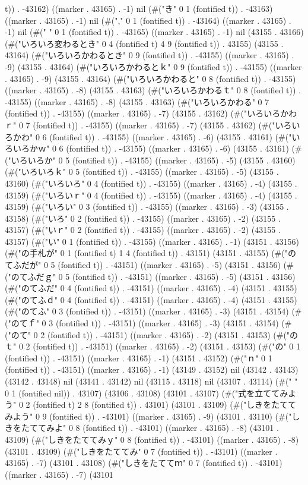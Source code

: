 t)) . -43162) ((marker . 43165) . -1) nil (#("き" 0 1 (fontified t)) . -43163) ((marker . 43165) . -1) nil (#("," 0 1 (fontified t)) . -43164) ((marker . 43165) . -1) nil (#(" " 0 1 (fontified t)) . -43165) ((marker . 43165) . -1) nil (43155 . 43166) (#("いろいろ変わるとき" 0 4 (fontified t) 4 9 (fontified t)) . 43155) (43155 . 43164) (#("いろいろかわるとき" 0 9 (fontified t)) . -43155) ((marker . 43165) . -9) (43155 . 43164) (#("いろいろかわるとｋ" 0 9 (fontified t)) . -43155) ((marker . 43165) . -9) (43155 . 43164) (#("いろいろかわると" 0 8 (fontified t)) . -43155) ((marker . 43165) . -8) (43155 . 43163) (#("いろいろかわるｔ" 0 8 (fontified t)) . -43155) ((marker . 43165) . -8) (43155 . 43163) (#("いろいろかわる" 0 7 (fontified t)) . -43155) ((marker . 43165) . -7) (43155 . 43162) (#("いろいろかわｒ" 0 7 (fontified t)) . -43155) ((marker . 43165) . -7) (43155 . 43162) (#("いろいろかわ" 0 6 (fontified t)) . -43155) ((marker . 43165) . -6) (43155 . 43161) (#("いろいろかｗ" 0 6 (fontified t)) . -43155) ((marker . 43165) . -6) (43155 . 43161) (#("いろいろか" 0 5 (fontified t)) . -43155) ((marker . 43165) . -5) (43155 . 43160) (#("いろいろｋ" 0 5 (fontified t)) . -43155) ((marker . 43165) . -5) (43155 . 43160) (#("いろいろ" 0 4 (fontified t)) . -43155) ((marker . 43165) . -4) (43155 . 43159) (#("いろいｒ" 0 4 (fontified t)) . -43155) ((marker . 43165) . -4) (43155 . 43159) (#("いろい" 0 3 (fontified t)) . -43155) ((marker . 43165) . -3) (43155 . 43158) (#("いろ" 0 2 (fontified t)) . -43155) ((marker . 43165) . -2) (43155 . 43157) (#("いｒ" 0 2 (fontified t)) . -43155) ((marker . 43165) . -2) (43155 . 43157) (#("い" 0 1 (fontified t)) . -43155) ((marker . 43165) . -1) (43151 . 43156) (#("の手札が" 0 1 (fontified t) 1 4 (fontified t)) . 43151) (43151 . 43155) (#("のてふだが" 0 5 (fontified t)) . -43151) ((marker . 43165) . -5) (43151 . 43156) (#("のてふだｇ" 0 5 (fontified t)) . -43151) ((marker . 43165) . -5) (43151 . 43156) (#("のてふだ" 0 4 (fontified t)) . -43151) ((marker . 43165) . -4) (43151 . 43155) (#("のてふｄ" 0 4 (fontified t)) . -43151) ((marker . 43165) . -4) (43151 . 43155) (#("のてふ" 0 3 (fontified t)) . -43151) ((marker . 43165) . -3) (43151 . 43154) (#("のてｆ" 0 3 (fontified t)) . -43151) ((marker . 43165) . -3) (43151 . 43154) (#("のて" 0 2 (fontified t)) . -43151) ((marker . 43165) . -2) (43151 . 43153) (#("のｔ" 0 2 (fontified t)) . -43151) ((marker . 43165) . -2) (43151 . 43153) (#("の" 0 1 (fontified t)) . -43151) ((marker . 43165) . -1) (43151 . 43152) (#("ｎ" 0 1 (fontified t)) . -43151) ((marker . 43165) . -1) (43149 . 43152) nil (43142 . 43143) (43142 . 43148) nil (43141 . 43142) nil (43115 . 43118) nil (43107 . 43114) (#("	" 0 1 (fontified nil)) . 43107) (43106 . 43108) (43101 . 43107) (#("式を立ててみよう" 0 2 (fontified t) 2 8 (fontified t)) . 43101) (43101 . 43109) (#("しきをたててみよう" 0 9 (fontified t)) . -43101) ((marker . 43165) . -9) (43101 . 43110) (#("しきをたててみよ" 0 8 (fontified t)) . -43101) ((marker . 43165) . -8) (43101 . 43109) (#("しきをたててみｙ" 0 8 (fontified t)) . -43101) ((marker . 43165) . -8) (43101 . 43109) (#("しきをたててみ" 0 7 (fontified t)) . -43101) ((marker . 43165) . -7) (43101 . 43108) (#("しきをたててｍ" 0 7 (fontified t)) . -43101) ((marker . 43165) . -7) (43101 